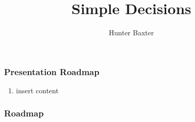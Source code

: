 \documentclass{beamer}
\title{Simple Decisions}
\author{Hunter Baxter}
\begin{document}
\maketitle

\begin{frame}
\frametitle{Presentation Roadmap}
\begin{enumerate}[I]
    \item insert content 
\end{enumerate}
    
\end{frame}


\begin{frame}
\frametitle{Roadmap}
    
\end{frame}
\end{document}

